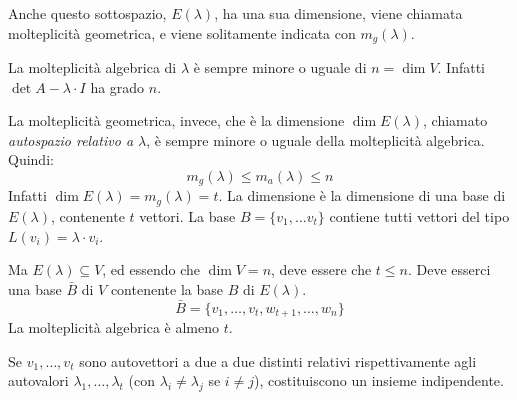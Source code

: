 Anche questo sottospazio, $E(\lambda)$, ha una sua dimensione, viene chiamata molteplicit\`a geometrica, e viene solitamente indicata con $m_g(\lambda)$.

La molteplicit\`a algebrica di $\lambda$ \`e sempre minore o uguale di $n = \dim V$. Infatti $\det{A - \lambda \cdot I}$ ha grado $n$.

La molteplicit\`a geometrica, invece, che \`e la dimensione $\dim E(\lambda)$, chiamato \emph{autospazio relativo a $\lambda$}, \`e sempre minore o uguale della molteplicit\`a algebrica. Quindi:
\[
m_g(\lambda) \le m_a(\lambda) \le n
\]
Infatti $\dim E(\lambda) = m_g(\lambda) = t$. La dimensione \`e la dimensione di una base di $E(\lambda)$, contenente $t$ vettori. La base $B = \{v_1, \ldots v_t \}$ contiene tutti vettori del tipo $L(v_i) = \lambda \cdot v_i$.

Ma $E(\lambda) \subseteq V$, ed essendo che $\dim V = n$, deve essere che $t \le n$. Deve esserci una base $\bar{B}$ di $V$ contenente la base $B$ di $E(\lambda)$.
\[
\bar{B} = \{ v_1, \ldots, v_t, w_{t+1}, \ldots, w_n \}
\]
La molteplicit\`a algebrica \`e almeno $t$.
\begin{prop}
Se $v_1, \ldots, v_t$ sono autovettori a due a due distinti relativi rispettivamente agli autovalori $\lambda_1, \ldots, \lambda_t$ (con $\lambda_i \neq \lambda_j$ se $i \neq j$), costituiscono un insieme indipendente.
\end{prop}

